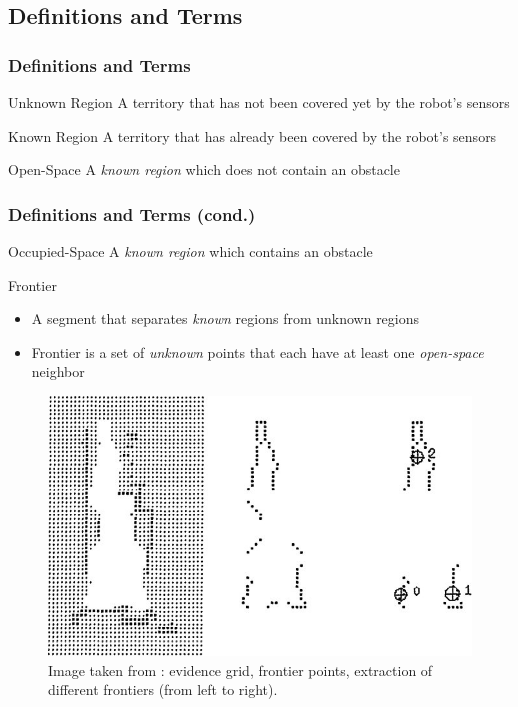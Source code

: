 \subsection{Definitions and Terms}
\begin{frame}
\frametitle{Definitions and Terms}

\begin{block}{Unknown Region}
A territory that has not been covered yet by the robot's sensors
\end{block}

\pause
\begin{block}{Known Region}
A territory that has already been covered by the robot's sensors
\end{block}

\pause
\begin{block}{Open-Space}
A \emph{known region} which does not contain an obstacle
\end{block}


\end{frame}

\begin{frame}
\frametitle{Definitions and Terms (cond.)}
\begin{block}{Occupied-Space}
A \emph{known region} which contains an obstacle
\end{block}

\pause

\begin{block}{Frontier}
\begin{itemize}
  \item A segment that separates \emph{known} regions from unknown regions
  \item Frontier is a set of \emph{unknown} points that each have at least one
  \emph{open-space} neighbor
\end{itemize}

\end{block}
\end{frame}

\begin{frame}
\begin{figure}
 \centering
 \includegraphics[width=0.8\columnwidth,keepaspectratio]{images/frontiers_example.jpg}
 \caption{Image taken from \citep{yamauchi_frontier-based_1998}: evidence
 grid, frontier points, extraction of different frontiers (from left to right).}
\end{figure}
\end{frame}